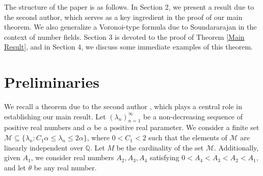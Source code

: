 \documentclass[reqno]{amsart}
\numberwithin{equation}{section}
\theoremstyle{plain}
\begin{document}
The structure of the paper is as follows. In Section 2, we present a result due to the second author, which serves as a key ingredient in the proof of our main theorem. We also generalize a Voronoi-type formula due to Soundararajan 
\cite{Sound} in the context of number fields. Section 3 is devoted to the proof of Theorem \ref{Main Result}, and in Section 4, we discuss some immediate examples of this theorem.



	\section{Preliminaries}
		 We recall a theorem due to the second author \cite{K. Mahatab}, which plays a central role in establishing our main result. Let $(\lambda_n)_{n=1}^{\infty}$ be a non-decreasing sequence of positive real numbers  and $\alpha$ be a positive real parameter. We consider a finite set $\mathcal{M}\subseteq \{\lambda_n: C_1 \alpha \leq \lambda_n\leq 2\alpha\}$, where $0<C_1<2$ such that the elements of $\mathcal{M}$ are linearly independent over $\mathbb{Q}$. Let $M$ be the cardinality of the set $\mathcal{M}$. Additionally, given $A_1$, we consider real numbers $A_2, A_3, A_4$ satisfying $0 < A_4 < A_3 < A_2 < A_1$, and let $\theta$ be any real number.
		 
\end{document}
